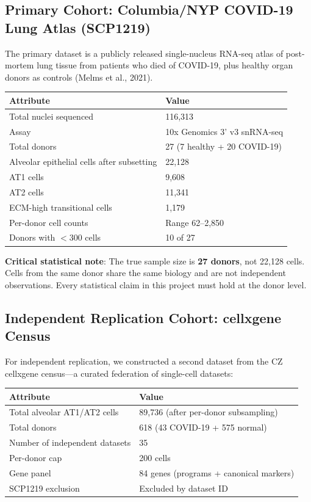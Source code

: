 \documentclass[11pt]{article}
\begin{document}
\subsection{Primary Cohort: Columbia/NYP COVID-19 Lung Atlas (SCP1219)}

The primary dataset is a publicly released single-nucleus RNA-seq atlas of post-mortem lung tissue from patients who died of COVID-19, plus healthy organ donors as controls (Melms et al., 2021).

\begin{center}
\small
\begin{tabular}{ll}
\toprule
Attribute & Value \\
\midrule
Total nuclei sequenced & 116,313 \\
Assay & 10x Genomics 3' v3 snRNA-seq \\
Total donors & 27 (7 healthy + 20 COVID-19) \\
Alveolar epithelial cells after subsetting & 22,128 \\
\quad AT1 cells & 9,608 \\
\quad AT2 cells & 11,341 \\
\quad ECM-high transitional cells & 1,179 \\
Per-donor cell counts & Range 62--2,850 \\
Donors with $<$300 cells & 10 of 27 \\
\bottomrule
\end{tabular}
\end{center}

\textbf{Critical statistical note}: The true sample size is \textbf{27 donors}, not 22,128 cells. Cells from the same donor share the same biology and are not independent observations. Every statistical claim in this project must hold at the donor level.

\subsection{Independent Replication Cohort: cellxgene Census}

For independent replication, we constructed a second dataset from the CZ cellxgene census---a curated federation of single-cell datasets:

\begin{center}
\small
\begin{tabular}{ll}
\toprule
Attribute & Value \\
\midrule
Total alveolar AT1/AT2 cells & 89,736 (after per-donor subsampling) \\
Total donors & 618 (43 COVID-19 + 575 normal) \\
Number of independent datasets & 35 \\
Per-donor cap & 200 cells \\
Gene panel & 84 genes (programs + canonical markers) \\
SCP1219 exclusion & Excluded by dataset ID \\
\bottomrule
\end{tabular}
\end{center}
\end{document}
